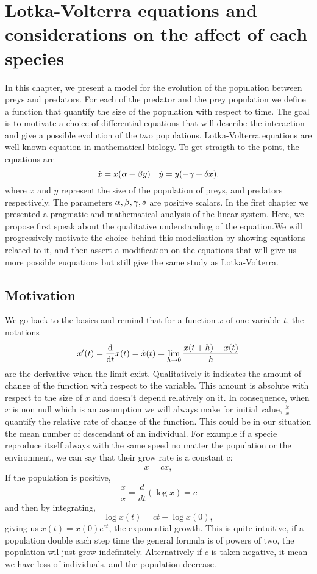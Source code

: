 \chapter{Lotka-Volterra equations and considerations on the affect of each species}

In this chapter, we present a model for the evolution of the population between preys and predators. For each of the predator and the prey population we define a function that quantify the size of the population with respect to time. The goal is to motivate a choice of differential equations that will describe the interaction and give a possible evolution of the two populations. Lotka-Volterra equations are well known equation in mathematical biology. To get straigth to the point, the equations are
\[\dot{x}=x(\alpha-\beta y) \quad  \dot{y} = y(-\gamma + \delta x).\]
where $x$ and $y$ represent the size of the population of preys, and predators respectively. The parameters $\alpha,\beta,\gamma,\delta$ are positive scalars. In the first chapter we presented a pragmatic and mathematical analysis of the linear system. Here, we propose first speak about the qualitative understanding of the equation.We will progressively motivate the choice behind this modelisation by showing equations related to it, and then assert a modification on the equations that will give us more possible euquations but still give the same study as Lotka-Volterra.

\section{Motivation} \label{sec:motiv}
We go back to the basics and remind that for a function $x$ of one variable $t$, the notations
\[x'(t) = \frac{\mathrm{d}}{\mathrm{d} t}x(t) = \dot{x}(t)= \lim_{h\to0}\frac{x(t+h)-x(t)}{h}\] 
are the derivative when the limit exist. Qualitatively it indicates the amount of change of the function with respect to the variable. This amount is absolute with respect to the size of $x$ and doesn't depend relatively on it. In consequence, when $x$ is non null which is an assumption we will always make for initial value, $\frac{\dot{x}}{x}$ quantify the relative rate of change of the function. This could be in our situation the mean number of descendant of an individual. For example if a specie reproduce itself always with the same speed no matter the population or the environment, we can say that their grow rate is a constant c:
\[ \dot{x} = cx, \]
If the population is positive, 
\[ \frac{\dot{x}}{x} = \frac{d}{dt}(\log{x}) = c \]
and then by integrating,
\[ \log{x(t)} = ct + \log{x(0)}, \]
giving us $x(t) = x(0)e^{ct}$, the exponential growth. This is quite intuitive, if a population double each step time the general formula is of powers of two, the population wil just grow indefinitely. Alternatively if $c$ is taken negative, it mean we have loss of individuals, and the population decrease.


